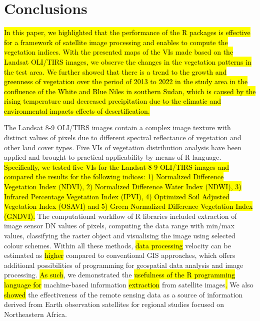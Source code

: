 \documentclass[jimaging,article,submit,pdftex,moreauthors]{Definitions/mdpi}
\begin{document}
\section{Conclusions}

\hl{In this paper, we highlighted that the performance of the R packages is effective for a framework of satellite image processing and enables to compute the vegetation indices. With the presented maps of the VIs made based on the Landsat OLI/TIRS images, we observe the changes in the vegetation patterns in the test area. We further showed that there is a trend to the growth and greenness of vegetation over the period of 2013 to 2022 in the study area in the confluence of the White and Blue Niles in southern Sudan, which is caused by the rising temperature and decreased precipitation due to the climatic and environmental impacts effects of desertification.}

The Landsat 8-9 OLI/TIRS images contain a complex image texture with distinct values of pixels due to different spectral reflectance of vegetation and other land cover types. Five VIs of vegetation distribution analysis have been applied and brought to practical applicability by means of R language. \hl{Specifically, we tested five VIs for the Landsat 8-9 OLI/TIRS images and compared the results for the following indices: 1) Normalized Difference Vegetation Index (NDVI), 2) Normalized Difference Water Index (NDWI), 3) Infrared Percentage Vegetation Index (IPVI), 4) Optimized Soil Adjusted Vegetation Index (OSAVI) and 5) Green Normalized Difference Vegetation Index (GNDVI). }The computational workflow of R libraries included extraction of image sensor DN values of pixels, computing the data range with min/max values, classifying the raster object and visualising the image using selected colour schemes. Within all these methods, \hl{data processing} velocity can be estimated as \hl{higher} compared to conventional GIS approaches, which offers additional possibilities of programming for geospatial data analysis and image processing. \hl{As such}, we demonstrated the \hl{usefulness of the R programming language for }machine-based information \hl{extraction }from satellite images\hl{. }We also \hl{showed} the effectiveness of the remote sensing data as a source of information derived from Earth observation satellites for regional studies focused on Northeastern Africa.
\end{document}
